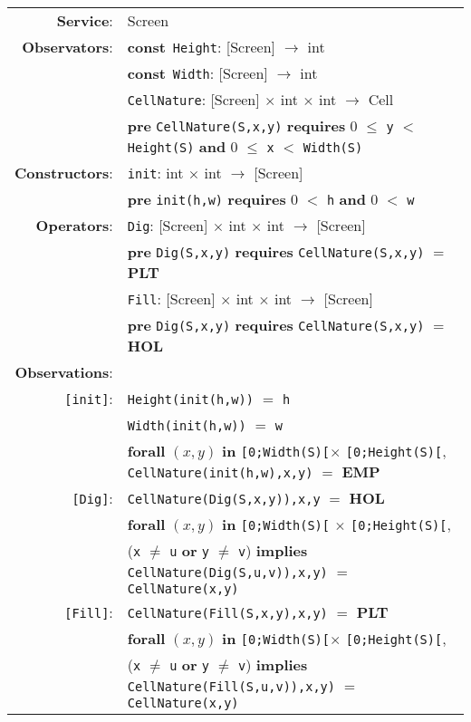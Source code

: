\documentclass{article}
\begin{document}
\begin{tabular}{rl}
\textbf{Service}: & \textrm{Screen}  \\
\textbf{Observators}: & \textbf{const}~\texttt{Height}: \textrm{[Screen]} $\rightarrow$ \textrm{int} \\
& \textbf{const}~\texttt{Width}: \textrm{[Screen]} $\rightarrow$ \textrm{int} \\
& \texttt{CellNature}: \textrm{[Screen]} $\times$ \textrm{int} $\times$ \textrm{int} $\rightarrow$ \textrm{Cell} \\
& \quad \textbf{pre } \texttt{CellNature(S,x,y)} \textbf{ requires } 0 $\leq$ \texttt{y} $<$ \texttt{Height(S)} \textbf{ and } 0 $\leq$ \texttt{x} $<$ \texttt{Width(S)}\\
\textbf{Constructors}: & \texttt{init}: \textrm{int} $\times$ \textrm{int} $\rightarrow$ \textrm{[Screen]} \\
& \quad \textbf{pre } \texttt{init(h,w)} \textbf{ requires } 0 $<$ \texttt{h} \textbf{ and } 0 $<$ \texttt{w} \\
\textbf{Operators}: & \texttt{Dig}: \textrm{[Screen]} $\times$ \textrm{int} $\times$ \textrm{int}  $\rightarrow$ \textrm{[Screen]} \\
& \quad \textbf{pre } \texttt{Dig(S,x,y)} \textbf{ requires } \texttt{CellNature(S,x,y)} $=$ \textbf{PLT} \\
& \texttt{Fill}: \textrm{[Screen]} $\times$ \textrm{int} $\times$ \textrm{int}  $\rightarrow$ \textrm{[Screen]} \\
& \quad \textbf{pre } \texttt{Dig(S,x,y)} \textbf{ requires } \texttt{CellNature(S,x,y)} $=$ \textbf{HOL} \\
       \textbf{Observations}: & \\
       \texttt{[init]}: & \texttt{Height(init(h,w))} $=$ \texttt{h} \\
       & \texttt{Width(init(h,w))} $=$ \texttt{w} \\
       & \textbf{forall} $(x,y)$ \textbf{in} \texttt{[0;Width(S)[}$\times$ \texttt{[0;Height(S)[},~ \texttt{CellNature(init(h,w),x,y)} $=$ \textbf{EMP} \\
       \texttt{[Dig]}: & \texttt{CellNature(Dig(S,x,y)),x,y} $=$ \textbf{HOL} \\
        & \textbf{forall} $(x,y)$ \textbf{in} \texttt{[0;Width(S)[} $\times$ \texttt{[0;Height(S)[}, \\ & \quad\quad\quad\quad (\texttt{x} $\neq$ \texttt{u} \textbf{or} \texttt{y} $\neq$ \texttt{v}) \textbf{implies} \texttt{CellNature(Dig(S,u,v)),x,y)} $=$ \texttt{CellNature(x,y)} \\
       \texttt{[Fill]}: & \texttt{CellNature(Fill(S,x,y),x,y)} $=$ \textbf{PLT} \\
       & \textbf{forall} $(x,y)$ \textbf{in} \texttt{[0;Width(S)[}$\times$ \texttt{[0;Height(S)[}, \\ & \quad\quad\quad\quad (\texttt{x} $\neq$ \texttt{u} \textbf{or} \texttt{y} $\neq$ \texttt{v}) \textbf{implies} \texttt{CellNature(Fill(S,u,v)),x,y)} $=$ \texttt{CellNature(x,y)} \\
\end{tabular}
\end{document}
